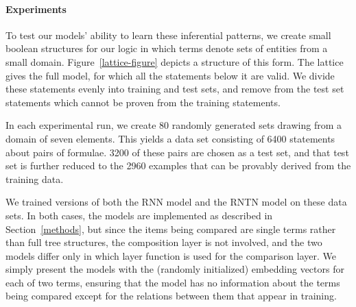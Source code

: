 
\paragraph{Experiments}
To test our models' ability to learn these inferential patterns, we
create small boolean structures for our logic in which terms denote
sets of entities from a small domain.  Figure~\ref{lattice-figure}
depicts a structure of this form. The lattice gives the full model,
for which all the statements below it are valid. We divide these
statements evenly into training and test sets, and remove from the
test set statements which cannot be proven from the training
statements.

In each experimental run, we create 80 randomly generated sets drawing from
a domain of seven elements. This yields a data set consisting of
6400 statements about pairs of formulae. 3200 of these pairs are
chosen as a test set, and that test set is further reduced to the 2960
examples that can be provably derived from the training data.

We trained versions of both the RNN model and the RNTN model on these
data sets. In both cases, the models are implemented as
described in Section~\ref{methods}, but since the items being compared
are single terms rather than full tree structures, the composition
layer is not involved, and the two models differ only in which
layer function is used for the comparison layer. We simply present
the models with the (randomly initialized) embedding vectors for each
of two terms, ensuring that the model has no information about the terms
being compared except for the relations between them that appear in training.


